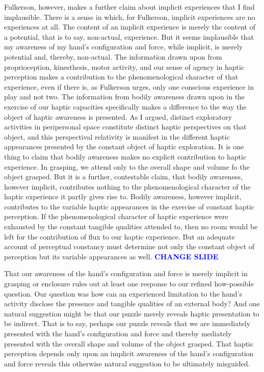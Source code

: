 \documentclass[12pt]{article}
\newcommand{\change}{\textcolor{blue}{\textbf{CHANGE SLIDE}}}
\begin{document}
Fulkerson, however, makes a further claim about implicit experiences that I find implausible. There is a sense in which, for Fulkerson, implicit experiences are no experiences at all. The content of an implicit experience is merely the content of a potential, that is to say, non-actual, experience. But it seems implausible that my awareness of my hand's configuration and force, while implicit, is merely potential and, thereby, non-actual. The information drawn upon from proprioception, kinesthesis, motor activity, and our sense of agency in haptic perception makes a contribution to the phenomenological character of that experience, even if there is, as Fulkerson urges, only one conscious experience in play and not two. The information from bodily awareness drawn upon in the exercise of our haptic capacities specifically makes a difference to the way the object of haptic awareness is presented. As I argued, distinct exploratory activities in peripersonal space constitute distinct haptic perspectives on that object, and this perspectival relativity is manifest in the different haptic appearances presented by the constant object of haptic exploration. It is one thing to claim that bodily awareness makes no explicit contribution to haptic experience. In grasping, we attend only to the overall shape and volume fo the object grasped. But it is a further, contestable claim, that bodily awareness, however implicit, contributes nothing to the phenomenological character of the haptic experience it partly gives rise to. Bodily awareness, however implicit, contributes to the variable haptic appearances in the exercise of constant haptic perception. If the phenomenological character of haptic experience were exhausted by the constant tangible qualities attended to, then no room would be left for the contribution of flux to our haptic experience. But an adequate account of perceptual constancy must determine not only the constant object of perception but its variable appearances as well. \change

That our awareness of the hand's configuration and force is merely implicit in grasping or enclosure rules out at least one response to our refined how-possible question. Our question was how can an experienced limitation to the hand's activity disclose the presence and tangible qualities of an external body? And one natural suggestion might be that our puzzle merely reveals haptic presentation to be indirect. That is to say, perhaps our puzzle reveals that we are immediately presented with the hand's configuration and force and thereby mediately presented with the overall shape and volume of the object grasped. That haptic perception depends only upon an implicit awareness of the hand's configuration and force reveals this otherwise natural suggestion to be ultimately misguided.
\end{document}
